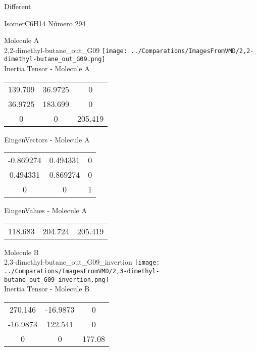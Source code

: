 \begin{center}
\vtab
\vtab
\textcolor{NavyBlue}{\Large Different}
\end{center}

 \newpage

\vtab[-2cm]
\begin{center}
{\large IsomerC6H14 \tab Número 294}
\end{center}
\begin{multicols}{2}
\begin{center}

Molecule A \\ 
2,2-dimethyl-butane\_out\_G09
\texttt{[image: ../Comparations/ImagesFromVMD/2,2-dimethyl-butane\_out\_G09.png]}
\\
Inertia Tensor - Molecule A \\
\vtab

\begin{tabular}{|c c c|}
139.709	 & 	36.9725	 & 	0	 \\
36.9725	 & 	183.699	 & 	0	 \\
0	 & 	0	 & 	205.419
\end{tabular}

\vtab
 EingenVectors - Molecule A     \\
\vtab
\begin{tabular}{|c c c|}
-0.869274	 & 	0.494331	 & 	0	 \\
0.494331	 & 	0.869274	 & 	0	 \\
0	 & 	0	 & 	1
\end{tabular}

\vtab
 EingenValues - Molecule A     \\
\vtab
\begin{tabular}{|c c c|}
118.683	 & 	204.724	 & 	205.419	 \\
\end{tabular}
\columnbreak

Molecule B \\ 
2,3-dimethyl-butane\_out\_G09\_invertion
\texttt{[image: ../Comparations/ImagesFromVMD/2,3-dimethyl-butane\_out\_G09\_invertion.png]}
\\
Inertia Tensor - Molecule B \\
\vtab

\begin{tabular}{|c c c|}
270.146	 & 	-16.9873	 & 	0	 \\
-16.9873	 & 	122.541	 & 	0	 \\
0	 & 	0	 & 	177.08
\end{tabular}


\end{center}
\end{multicols}
